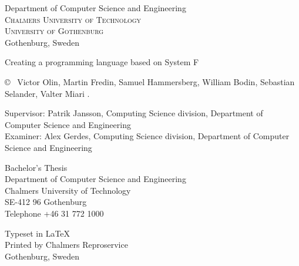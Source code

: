 \begin{center}
	Department of Computer Science and Engineering \\
	\textsc{Chalmers University of Technology} \\
	\textsc{University of Gothenburg} \\
	Gothenburg, Sweden \the\year \\
\end{center}


\newpage
\thispagestyle{plain}
\vspace*{4.5cm}
Creating a programming language based on System F\\
\setlength{\parskip}{1cm}

\copyright ~ Victor Olin, Martin Fredin, Samuel Hammersberg, William Bodin, Sebastian Selander, Valter Miari \the\year. \setlength{\parskip}{1cm}

Supervisor: Patrik Jansson, Computing Science division, Department of Computer Science and Engineering\\
Examiner: Alex Gerdes, Computing Science division, Department of Computer Science and Engineering \setlength{\parskip}{1cm}

Bachelor's Thesis \the\year\\	
Department of Computer Science and Engineering\\
Chalmers University of Technology\\
SE-412 96 Gothenburg\\
Telephone +46 31 772 1000 \setlength{\parskip}{0.5cm}

\vfill

Typeset in \LaTeX \tagtemp\\
Printed by Chalmers Reproservice\\
Gothenburg, Sweden \the\year
